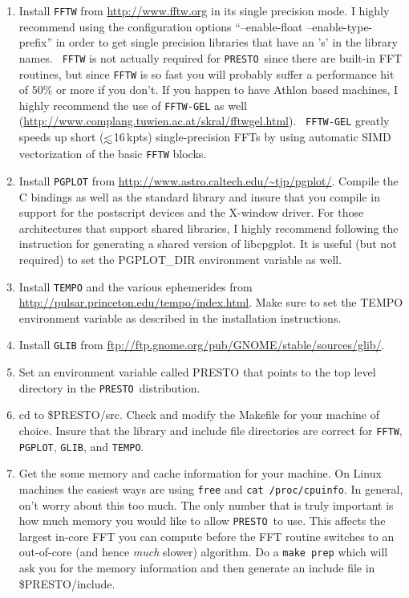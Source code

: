\documentclass[11pt]{article}
\newcommand{\PRESTO}{{\tt PRESTO}}
\newcommand{\la}{\mathrel{\hbox{\rlap{\hbox{\lower4pt\hbox{$\sim$}}}\hbox{$<$}}}}
\begin{document}
\begin{enumerate}
  
\item Install {\tt FFTW} from \url{http://www.fftw.org} in its single
  precision mode.  I highly recommend using the configuration options
  ``--enable-float --enable-type-prefix'' in order to get single
  precision libraries that have an 's' in the library names.  {\tt
    FFTW} is not actually required for \PRESTO\ since there are
  built-in FFT routines, but since {\tt FFTW} is so fast you will
  probably suffer a performance hit of 50\% or more if you don't.  If
  you happen to have Athlon based machines, I highly recommend the use
  of {\tt FFTW-GEL} as well
  (\url{http://www.complang.tuwien.ac.at/skral/fftwgel.html}).  {\tt
    FFTW-GEL} greatly speeds up short ($\la$16\,kpts) single-precision
  FFTs by using automatic SIMD vectorization of the basic {\tt FFTW}
  blocks.
  
\item Install {\tt PGPLOT} from
  \url{http://www.astro.caltech.edu/~tjp/pgplot/}.  Compile the C
  bindings as well as the standard library and insure that you compile
  in support for the postscript devices and the X-window driver.  For
  those architectures that support shared libraries, I highly
  recommend following the instruction for generating a shared version
  of libcpgplot.  It is useful (but not required) to set the
  PGPLOT\_DIR environment variable as well.
  
\item Install {\tt TEMPO} and the various ephemerides from
  \url{http://pulsar.princeton.edu/tempo/index.html}.  Make sure to
  set the TEMPO environment variable as described in the installation
  instructions.

\item Install {\tt GLIB} from
  \url{ftp://ftp.gnome.org/pub/GNOME/stable/sources/glib/}.
  
\item Set an environment variable called PRESTO that points to the top
  level directory in the \PRESTO\ distribution.
  
\item cd to \$PRESTO/src.  Check and modify the Makefile for your
  machine of choice.  Insure that the library and include file
  directories are correct for {\tt FFTW}, {\tt PGPLOT}, {\tt GLIB},
  and {\tt TEMPO}.
  
\item Get the some memory and cache information for your machine.  On
  Linux machines the easiest ways are using {\tt free} and {\tt cat
    /proc/cpuinfo}. In general, on't worry about this too much.  The
  only number that is truly important is how much memory you would
  like to allow \PRESTO\ to use.  This affects the largest in-core FFT
  you can compute before the FFT routine switches to an out-of-core
  (and hence \emph{much} slower) algorithm.  Do a {\tt make prep}
  which will ask you for the memory information and then generate an
  include file in \$PRESTO/include.
  

\end{enumerate}
\end{document}
